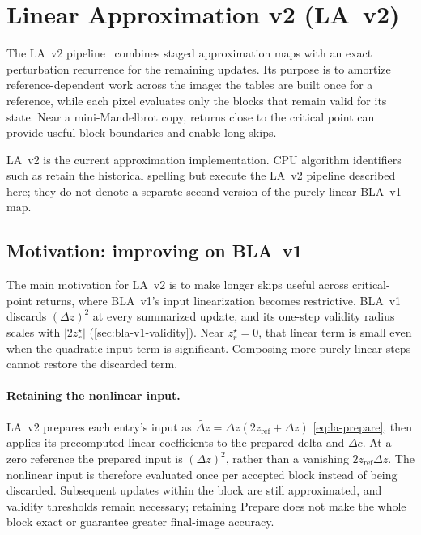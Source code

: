 \section{Linear Approximation v2 (LA~v2)}
\label{sec:la-v2-perturb}

The LA~v2 pipeline~\cite{Imagina} combines staged approximation maps with
an exact perturbation recurrence for the remaining updates. Its purpose
is to amortize reference-dependent work across the image: the tables are
built once for a reference, while each pixel evaluates only the blocks
that remain valid for its state. Near a mini-Mandelbrot copy, returns
close to the critical point can provide useful block boundaries and
enable long skips.

LA~v2 is the current approximation implementation. CPU algorithm
identifiers such as  retain the historical
 spelling but execute the LA~v2 pipeline described here;
they do not denote a separate second version of the purely linear
BLA~v1 map.

\subsection{Motivation: improving on BLA~v1}
\label{sec:la-v2-motivation}

The main motivation for LA~v2 is to make longer skips useful across
critical-point returns, where BLA~v1's input linearization becomes
restrictive. BLA~v1 discards $(\Delta z)^2$ at every summarized update,
and its one-step validity radius scales with $|2z_r^\star|$
(\cref{sec:bla-v1-validity}). Near $z_r^\star=0$, that linear term is
small even when the quadratic input term is significant. Composing
more purely linear steps cannot restore the discarded term.

\paragraph{Retaining the nonlinear input.}
LA~v2 prepares each entry's input as
$\tilde{\Delta z}=\Delta z(2z_\mathrm{ref}+\Delta z)$
\eqref{eq:la-prepare}, then applies its precomputed linear
coefficients to the prepared delta and $\Delta c$. At a zero reference
the prepared input is $(\Delta z)^2$, rather than a vanishing
$2z_\mathrm{ref}\Delta z$. The nonlinear input is therefore evaluated
once per accepted block instead of being discarded. Subsequent
updates within the block are still approximated, and validity
thresholds remain necessary; retaining Prepare does not make the
whole block exact or guarantee greater final-image accuracy.

